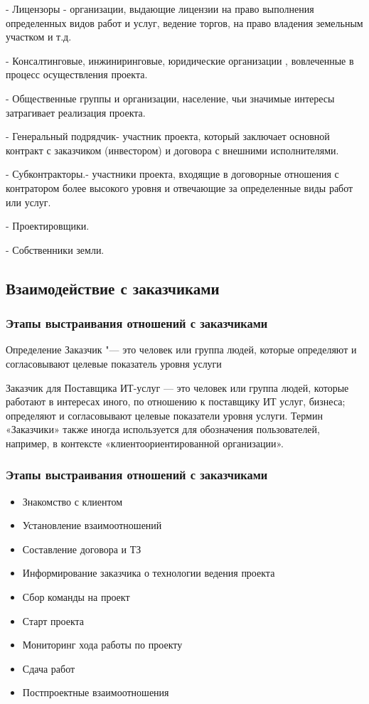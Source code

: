 \documentclass{../industrial-development}
\begin{document}
- Лицензоры - организации, выдающие лицензии на право выполнения определенных видов работ и услуг, ведение торгов, на право владения земельным участком и т.д.

- Консалтинговые, инжиниринговые, юридические организации , вовлеченные в процесс осуществления проекта.

- Общественные группы и организации, население, чьи значимые интересы затрагивает реализация проекта.

- Генеральный подрядчик- участник проекта, который заключает основной контракт с заказчиком (инвестором) и договора с внешними исполнителями.

- Субконтракторы.- участники проекта, входящие в договорные отношения с контратором более высокого уровня и отвечающие за определенные виды работ или услуг.

- Проектировщики.

- Собственники земли.

\subsection{Взаимодействие с заказчиками}
\begin{frame} \frametitle{Этапы выстраивания отношений с заказчиками}
	\begin{block}{Определение}
		\alert{Заказчик} "--- это человек или группа людей, которые определяют и согласовывают целевые показатель уровня услуги
	\end{block}
\end{frame}
	
\lecturenotes
Заказчик для Поставщика ИТ-услуг — это человек или группа людей, которые работают в интересах иного, по отношению к поставщику ИТ услуг, бизнеса; определяют и согласовывают целевые показатели уровня услуги. Термин «Заказчики» также иногда используется для обозначения пользователей, например, в контексте «клиентоориентированной организации».


\begin{frame} \frametitle{Этапы выстраивания отношений с заказчиками}

\begin{itemize}
 \item Знакомство с клиентом
 \item Установление взаимоотношений
 \item Составление договора и ТЗ
 \item Информирование заказчика о технологии ведения проекта
 \item Сбор команды на проект 
 \item Старт проекта 
 \item Мониторинг хода работы по проекту
 \item Сдача работ
 \item Постпроектные взаимоотношения
  \end{itemize}
\end{frame}
\end{document}
